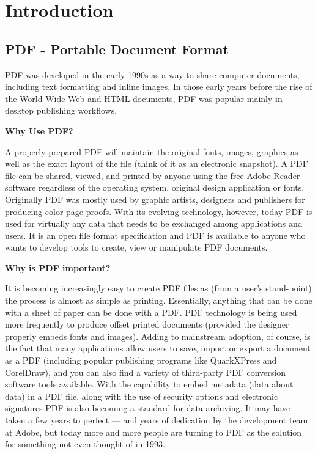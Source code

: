 \documentclass[paper.tex]{subfiles}
\begin{document}
\chapter{Introduction}

\section{PDF - Portable Document Format}
\par
PDF was developed in the early 1990s as a way to share computer documents, including text formatting and inline images.
In those early years before the rise of the World Wide Web and HTML documents, PDF was popular mainly in desktop publishing workflows.

\bigbreak
\textbf{Why Use PDF?}
\par
A properly prepared PDF will maintain the original fonts, images, graphics as well as the exact layout of the file (think of it as an electronic snapshot). A PDF file can be shared, viewed, and printed by anyone using the free Adobe Reader software regardless of the operating system, original design application or fonts.
Originally PDF was mostly used by graphic artists, designers and publishers for producing color page proofs. With its evolving technology, however, today PDF is used for virtually any data that needs to be exchanged among applications and users. It is an open file format specification and PDF is available to anyone who wants to develop tools to create, view or manipulate PDF documents.

\bigbreak
\textbf{Why is PDF important?}
\par
It is becoming increasingly easy to create PDF files as (from a user's stand-point) the process is almost as simple as printing. Essentially, anything that can be done with a sheet of paper can be done with a PDF. PDF technology is being used more frequently to produce offset printed documents (provided the designer properly embeds fonts and images).
Adding to mainstream adoption, of course, is the fact that many applications allow users to save, import or export a document as a PDF (including popular publishing programs like QuarkXPress and CorelDraw), and you can also find a variety of third-party PDF conversion software tools available. With the capability to embed metadata (data about data) in a PDF file, along with the use of security options and electronic signatures PDF is also becoming a standard for data archiving. It may have taken a few years to perfect — and years of dedication by the development team at Adobe, but today more and more people are turning to PDF as the solution for something not even thought of in 1993.
\end{document}
